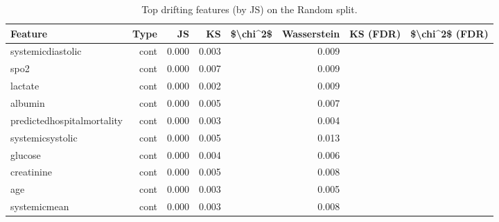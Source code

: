 \begin{table}
\caption{Top drifting features (by JS) on the Random split.}
\label{tab:topdrifting-random}
\begin{tabular}{lrrrrrrr}
\toprule
Feature & Type & JS & KS & \$\textbackslash chi\textasciicircum 2\$ & Wasserstein & KS (FDR) & \$\textbackslash chi\textasciicircum 2\$ (FDR) \\
\midrule
systemicdiastolic & cont & 0.000 & 0.003 &  & 0.009 &  &  \\
spo2 & cont & 0.000 & 0.007 &  & 0.009 &  &  \\
lactate & cont & 0.000 & 0.002 &  & 0.009 &  &  \\
albumin & cont & 0.000 & 0.005 &  & 0.007 &  &  \\
predictedhospitalmortality & cont & 0.000 & 0.003 &  & 0.004 &  &  \\
systemicsystolic & cont & 0.000 & 0.005 &  & 0.013 &  &  \\
glucose & cont & 0.000 & 0.004 &  & 0.006 &  &  \\
creatinine & cont & 0.000 & 0.005 &  & 0.008 &  &  \\
age & cont & 0.000 & 0.003 &  & 0.005 &  &  \\
systemicmean & cont & 0.000 & 0.003 &  & 0.008 &  &  \\
\bottomrule
\end{tabular}
\end{table}

